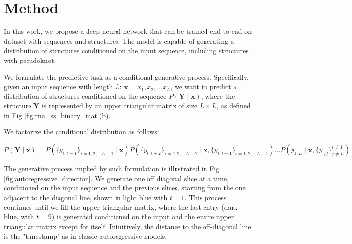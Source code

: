 \documentclass{article}
\begin{document}
\section{Method}


In this work, we propose a deep neural network that can be trained end-to-end on dataset with sequences and structures.
The model is capable of generating a distribution of structures conditioned on the input sequence,
including structures with pseudoknot.



We formulate the predictive task as a conditional generative process.
Specifically, given an input sequence with length $L$: $\bm{x} = x_1, x_2, \dots x_{L}$,
we want to predict a distribution of structures conditioned on the sequence $P(\bm{Y} \mid \bm{x})$,
where the structure $\bm{Y}$ is represented by an upper triangular matrix of size $L \times L$, as defined in Fig \ref{fig:rna_ss_binary_mat}(b).


We factorize the conditional distribution as follows:

\begin{equation} \label{eq:conditional_distribution}
{\scriptstyle
P(\bm{Y} \mid \bm{x}) = P(\{y_{i, i+1}\}_{i=1, 2, \dots L-1} \mid \bm{x})
P(\{y_{i, i+2}\}_{i=1, 2, \dots L-2} \mid \bm{x}, \{y_{i, i+1}\}_{i=1, 2, \dots L-1})
\dots
P(y_{1, L} \mid \bm{x}, \{y_{i, j}\}^{i \neq 1}_{j \neq L})}
\end{equation}


The generative process implied by such formulation is illustrated in Fig \ref{fig:autoregressive_direction}.
We generate one off diagonal slice at a time, conditioned on the input sequence and the previous slices,
starting from the one adjacent to the diagonal line, shown in light blue with $t=1$.
This process continues until we fill the upper triangular matrix,
where the last entry (dark blue, with $t=9$) is generated conditioned on the input and the entire upper triangular matrix except for itself.
Intuitively, the distance to the off-diagonal line is the "timestamp" as in classic autoregressive models.

%
%
\end{document}

